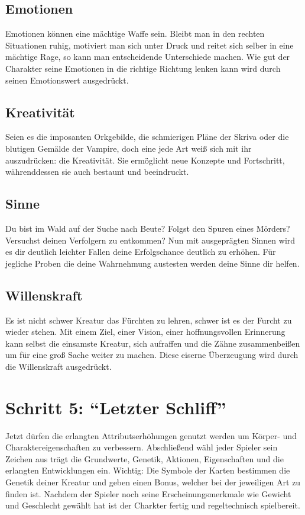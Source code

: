         \subsection*{Emotionen}
            Emotionen können eine mächtige Waffe sein. Bleibt man in den rechten Situationen ruhig, motiviert man sich unter Druck und reitet sich selber in eine mächtige Rage, so kann man entscheidende Unterschiede machen. Wie gut der Charakter seine Emotionen in die richtige Richtung lenken kann wird durch seinen Emotionswert ausgedrückt.

        \subsection*{Kreativität}
            Seien es die imposanten Orkgebilde, die schmierigen Pläne der Skriva oder die blutigen Gemälde der Vampire, doch eine jede Art weiß sich mit ihr auszudrücken: die Kreativität. Sie ermöglicht neue Konzepte und Fortschritt, währenddessen sie auch bestaunt und beeindruckt.

        \subsection*{Sinne}
            Du bist im Wald auf der Suche nach Beute? Folgst den Spuren eines Mörders? Versuchst deinen Verfolgern zu entkommen? Nun mit ausgeprägten Sinnen wird es dir deutlich leichter Fallen deine Erfolgschance deutlich zu erhöhen. Für jegliche Proben die deine Wahrnehmung austesten werden deine Sinne dir helfen.

        \subsection*{Willenskraft}
            Es ist nicht schwer Kreatur das Fürchten zu lehren, schwer ist es der Furcht zu wieder stehen. Mit einem Ziel, einer Vision, einer hoffnungsvollen Erinnerung kann selbst die einsamste Kreatur, sich aufraffen und die Zähne zusammenbeißen um für eine groß Sache weiter zu machen. Diese eiserne Überzeugung wird durch die Willenskraft ausgedrückt.

    

    \section{Schritt 5: “Letzter Schliff”}
        Jetzt dürfen die erlangten Attributserhöhungen genutzt werden um Körper- und Charaktereigenschaften zu verbessern.
        Abschließend wähl jeder Spieler sein Zeichen aus trägt die Grundwerte, Genetik, Aktionen, Eigenschaften und die erlangten Entwicklungen ein. Wichtig: Die Symbole der Karten bestimmen die Genetik deiner Kreatur und geben einen Bonus, welcher bei der jeweiligen Art zu finden ist. Nachdem der Spieler noch seine Erscheinungsmerkmale wie Gewicht und Geschlecht gewählt hat ist der Charkter fertig und regeltechnisch spielbereit.


